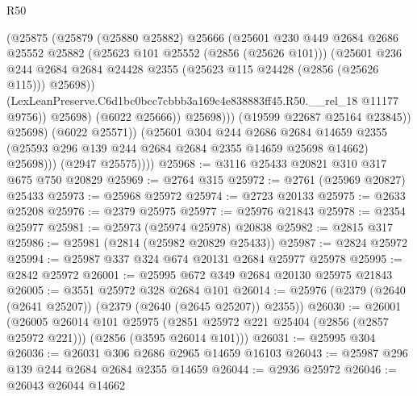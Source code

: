\begin{lexlean}{R50}
\begin{coremodule}
                            (@25875
                              (@25879
                                (@25880 @25882)
                                @25666
                                (@25601
                                  @230
                                  @449
                                  @2684
                                  @2686
                                  @25552
                                  @25882
                                  (@25623 @101 @25552 (@2856 (@25626 @101)))
                                  (@25601
                                    @236
                                    @244
                                    @2684
                                    @2684
                                    @24428
                                    @2355
                                    (@25623 @115 @24428 (@2856 (@25626 @115)))
                                    @25698))
                                (LexLeanPreserve.C6d1bc0bcc7cbbb3a169c4e838883ff45.R50.__rel_18
                                  @11177
                                  @9756))
                              @25698)
                            (@6022 @25666))
                          @25698)))
                    (@19599 @22687 @25164 @23845))
                  @25698)
                (@6022 @25571))
              (@25601
                @304
                @244
                @2686
                @2684
                @14659
                @2355
                (@25593 @296 @139 @244 @2684 @2684 @2355 @14659 @25698 @14662)
                @25698)))
          (@2947 @25575))))
@25968 := @3116 @25433 @20821 @310 @317 @675 @750 @20829
@25969 := @2764 @315
@25972 := @2761 (@25969 @20827) @25433
@25973 := @25968 @25972
@25974 := @2723 @20133
@25975 := @2633 @25208
@25976 := @2379 @25975
@25977 := @25976 @21843
@25978 := @2354 @25977
@25981 := @25973 (@25974 @25978) @20838
@25982 := @2815 @317
@25986 := @25981 (@2814 (@25982 @20829 @25433))
@25987 := @2824 @25972
@25994 := @25987 @337 @324 @674 @20131 @2684 @25977 @25978
@25995 := @2842 @25972
@26001 := @25995 @672 @349 @2684 @20130 @25975 @21843
@26005 := @3551 @25972 @328 @2684 @101
@26014 := @25976 (@2379 (@2640 (@2641 @25207)) (@2379 (@2640 (@2645 @25207)) @2355))
@26030 := @26001
    (@26005
      @26014
      @101
      @25975
      (@2851 @25972 @221 @25404 (@2856 (@2857 @25972 @221)))
      (@2856 (@3595 @26014 @101)))
@26031 := @25995 @304
@26036 := @26031 @306 @2686 @2965 @14659 @16103
@26043 := @25987 @296 @139 @244 @2684 @2684 @2355 @14659
@26044 := @2936 @25972
@26046 := @26043 @26044 @14662

\end{coremodule}
\end{lexlean}
